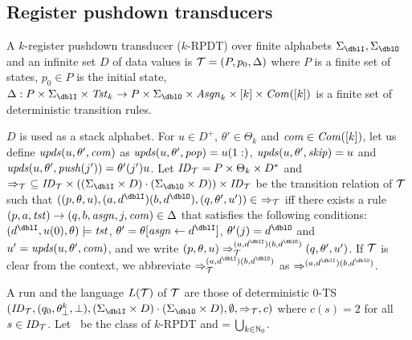 \subsection{Register pushdown transducers}
\begin{definition}
A $k$-{register pushdown transducer} ($k$-RPDT) over finite alphabets $\Sigma_\dblI,\Sigma_\dblO$ and an infinite set $D$ of data values is
${\cal T}=(P, p_0, \Delta)$ where
$P$ is a finite set of states,
$p_0\in P$ is the initial state,
$\Delta: P\times\Sigma_\dblI\times\Tst_k \to P\times\Sigma_\dblO\times \Asgn_k \times [k]\times \Com([k])$ is a finite set of deterministic transition rules.
\end{definition}
$D$ is used as a stack alphabet.
For $u\in D^+$, $\theta'\in\Theta_k$ and $\mathit{com}\in\mathit{Com}([k])$, let us define $\mathit{upds}(u,\theta',\mathit{com})$ as $\mathit{upds}(u,\theta',\mathit{pop})=u(1:)$, $\mathit{upds}(u,\theta',\mathit{skip})=u$ and $\mathit{upds}(u,\theta',\mathit{push}(j'))=\theta'(j')u$.
Let $\mathit{ID}_{\cal T}= P\times \Theta_k\times D^*$
and $\Rightarrow_\calT\ \subseteq \ID_\calT\times ((\Sigma_\dblI\times D)\cdot(\Sigma_\dblO\times D))\times \ID_\calT$ be the transition relation of ${\cal T}$ such that $((p, \theta, u), (a,d^\dblI)(b,d^\dblO), (q, \theta', u'))\in\ \Rightarrow_\calT$ iff
there exists a rule $(p, a, \mathit{tst}) \to (q, b, \mathit{asgn}, j, \mathit{com}) \in \Delta$
that satisfies the following conditions:
$(d^\dblI, u(0), \theta)\models\tst$, $\theta' = \theta[\asgn\leftarrow d^\dblI]$, $\theta'(j) = d^\dblO$ and
$u'=\mathit{upds}(u,\theta',\mathit{com})$,
and we write $(p, \theta, u) \done_{\calT}^{(a,d^\dblI)(b,d^\dblO)}(q, \theta', u')$.
If ${\cal T}$ is clear from the context,
we abbreviate
$\done_{\calT}^{(a,d^\dblI)(b,d^\dblO)}$ as $\done^{(a,d^\dblI)(b,d^\dblO)}$.

A run and the language $L({\cal T})$ of ${\cal T}$ are those of deterministic $0$-TS $(\ID_\calT, (q_0,\theta^k_\bot, \bot), (\Sigma_\dblI\times D)\cdot(\Sigma_\dblO\times D), \emptyset, \Rightarrow_\calT, c)$ where $c(s)=2$ for all $s\in\mathit{ID}_{\cal T}$.
Let \RPDTk\ be the class of $k$-RPDT and \RPDT = $\bigcup_{k\in\mathbb{N}_0}$\RPDTk.

